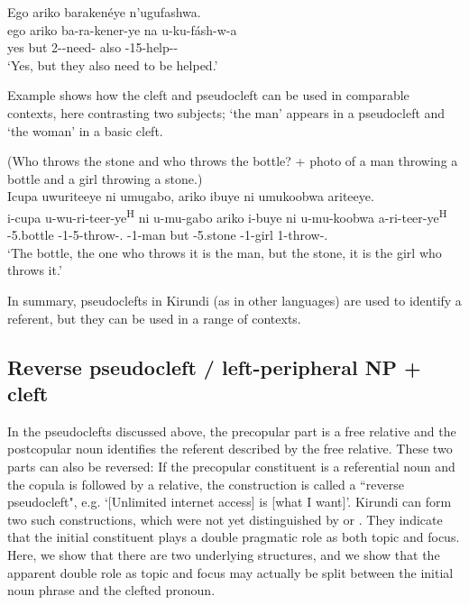 \documentclass[output=paper]{langscibook}
\begin{document}
\ex
Ego ariko barakenéye n’ugufashwa.\\
\gll
ego  ariko  ba-ra-kener-ye  na  u-ku-fásh-w-a\\
yes  but  2\SM-\DJ-{}need-\PFV{}  also  \AUG{}-15-help-\PASS-\FV{}\\
\glt
‘Yes, but they also need to be helped.’\\

\z
\z

Example  shows how the cleft and pseudocleft can be used in comparable contexts, here contrasting two subjects; ‘the man’ appears in a pseudocleft and ‘the woman’ in a basic cleft.

\ea
\label{bkm:Ref142585865}
(Who throws the stone and who throws the bottle? + photo of a man throwing a bottle and a girl throwing a stone.)\\
Icupa uwuriteeye ni umugabo, ariko ibuye ni umukoobwa ariteeye.\\
\gll
i-cupa  u-wu-ri-teer-ye\textsuperscript{H}  ni  u-mu-gabo  ariko  i-buye  ni  u-mu-koobwa  a-ri-teer-ye\textsuperscript{H}   \\
\AUG{}-5.bottle  \AUG{}-1-5\OM{}-throw-\PFV.\REL{}  \COP{}  \AUG{}-1-man  but \AUG{}-5.stone  \COP{}  \AUG{}-1-girl  1\OM{}-throw-\PFV.\REL{} \\
\glt
‘The bottle, the one who throws it is the man, but the stone, it is the girl who throws it.’\\

\z

In summary, pseudoclefts in Kirundi (as in other languages) are used to identify a referent, but they can be used in a range of contexts.

\subsection{Reverse pseudocleft / left-peripheral NP + cleft}

In the pseudoclefts discussed above, the precopular part is a free relative and the postcopular noun identifies the referent described by the free relative. These two parts can also be reversed: If the precopular constituent is a referential noun and the copula is followed by a relative, the construction is called a ``reverse pseudocleft", e.g. ‘[Unlimited internet access] is [what I want]’. Kirundi can form two such constructions, which were not yet distinguished by \citet{Nshemezimana2016} or \citet{LafkiouiEtAl2016}. They indicate that the initial constituent plays a double pragmatic role as both topic and focus. Here, we show that there are two underlying structures, and we show that the apparent double role as topic and focus may actually be split between the initial noun phrase and the clefted pronoun.
\end{document}
